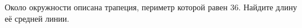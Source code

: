\begin{ex}
	\begin{condition}
		Около окружности описана трапеция, периметр которой равен \( 36 \). Найдите длину её средней линии.
	\end{condition}
\end{ex}